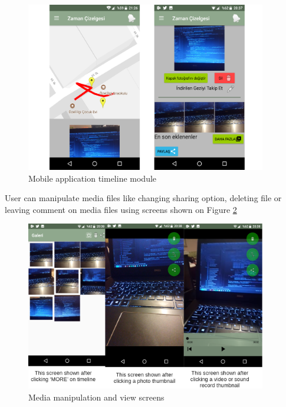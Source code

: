 \begin{figure}[!htbp]
\centering
\includegraphics[height=20em]{projectChapters/images/timeLine.png}
\caption{Mobile application timeline module}
\label{fig:timeLine}
\end{figure}

User can manipulate media files like changing sharing option, deleting file or leaving comment on media files using screens shown on Figure \ref{fig:media}


\begin{figure}[!htbp]
\centering
\includegraphics[height=20em]{projectChapters/images/media.png}
\caption{Media manipulation and view screens}
\label{fig:media}
\end{figure}




